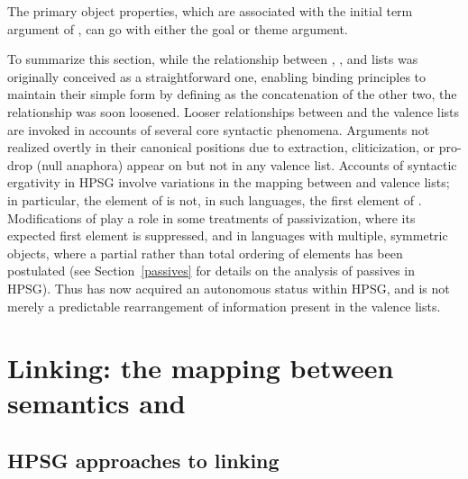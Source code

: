 \documentclass[output=paper,biblatex,babelshorthands,newtxmath,draftmode,colorlinks, citecolor=brown]{langscibook}
\begin{document}
\noindent
The primary object properties, which are associated with the initial term argument of \comps, can go
with either the goal or theme argument.

\largerpage
To summarize this section, while the relationship between \argst, \subj, and \comps lists was
originally conceived as a straightforward one, enabling binding principles to maintain their simple
form by defining \argst as the concatenation of the other two, the relationship was soon loosened.
Looser relationships between \argst and the valence lists are invoked in accounts of several core
syntactic phenomena.  Arguments not realized overtly in their canonical positions due to extraction,
cliticization, or pro-drop (null anaphora) appear on \argst but not
in any valence list.  Accounts of syntactic ergativity in HPSG involve variations in the mapping
between \argst and valence lists; in particular, the element of \subj is not, in such languages, the
first element of \argst.  Modifications of \argst play a role in some treatments of passivization,
where its expected first element is suppressed, and in languages with multiple, symmetric objects,
where a partial rather than total ordering of \argst elements has been postulated (see
Section~\ref{passives} for details on the analysis of passives in HPSG).  Thus \argst has now
acquired an autonomous %
status within HPSG, and is not merely a predictable rearrangement of information present in the
valence lists.   


\section{Linking: the mapping between semantics and \argst}
\label{linking-sec}\label{arg-st:sec-linking}

\subsection{HPSG approaches to linking}
\label{arg-st:sec-hpsg-approaches-to-linking}
\end{document}
